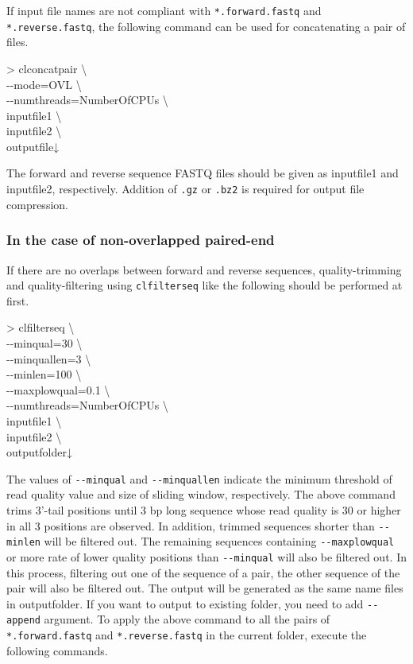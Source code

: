 \documentclass[titlepage,10pt,a4paper,english]{jsbook}
\newenvironment{cmd}{\begin{oframed}\raggedright\ttfamily\footnotesize\setlength{\baselineskip}{1.4em}}{\end{oframed}\vspace{-1em}}
\begin{document}
If input file names are not compliant with \texttt{*.forward.fastq} and \texttt{*.reverse.fastq}, the following command can be used for concatenating a pair of files.

\begin{cmd}
{\textgreater} clconcatpair {\textbackslash}\\
{-}{-}mode=OVL {\textbackslash}\\
{-}{-}numthreads=NumberOfCPUs {\textbackslash}\\
inputfile1 {\textbackslash}\\
inputfile2 {\textbackslash}\\
outputfile↓
\end{cmd}

The forward and reverse sequence FASTQ files should be given as inputfile1 and inputfile2, respectively.
Addition of \texttt{.gz} or \texttt{.bz2} is required for output file compression.

\subsubsection{In the case of non-overlapped paired-end}

If there are no overlaps between forward and reverse sequences, quality-trimming and quality-filtering using \texttt{clfilterseq} like the following should be performed at first.

\begin{cmd}
{\textgreater} clfilterseq {\textbackslash}\\
{-}{-}minqual=30 {\textbackslash}\\
{-}{-}minquallen=3 {\textbackslash}\\
{-}{-}minlen=100 {\textbackslash}\\
{-}{-}maxplowqual=0.1 {\textbackslash}\\
{-}{-}numthreads=NumberOfCPUs {\textbackslash}\\
inputfile1 {\textbackslash}\\
inputfile2 {\textbackslash}\\
outputfolder↓
\end{cmd}

The values of \texttt{{-}{-}minqual} and \texttt{{-}{-}minquallen} indicate the minimum threshold of read quality value and size of sliding window, respectively.
The above command trims 3'-tail positions until 3 bp long sequence whose read quality is 30 or higher in all 3 positions are observed.
In addition, trimmed sequences shorter than \texttt{{-}{-}minlen} will be filtered out.
The remaining sequences containing \texttt{{-}{-}maxplowqual} or more rate of lower quality positions than \texttt{{-}{-}minqual} will also be filtered out.
In this process, filtering out one of the sequence of a pair, the other sequence of the pair will also be filtered out.
The output will be generated as the same name files in outputfolder.
If you want to output to existing folder, you need to add \texttt{{-}{-}append} argument.
To apply the above command to all the pairs of \texttt{*.forward.fastq} and \texttt{*.reverse.fastq} in the current folder, execute the following commands.
\end{document}

